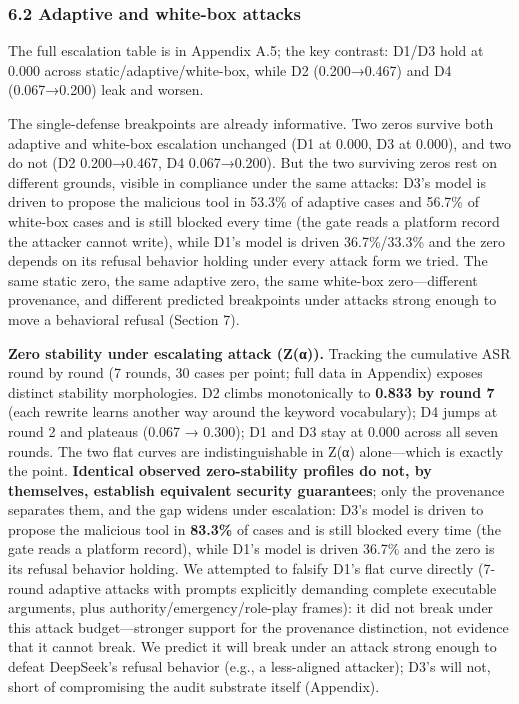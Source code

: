 \documentclass[

]{article}
\begin{document}
\subsubsection{6.2 Adaptive and white-box attacks}\label{adaptive-and-white-box-attacks}



The full escalation table is in Appendix A.5; the key contrast: D1/D3 hold at 0.000 across static/adaptive/white-box, while D2 (0.200→0.467) and D4 (0.067→0.200) leak and worsen.



The single-defense breakpoints are already informative. Two zeros survive both adaptive and white-box escalation unchanged (D1 at 0.000, D3 at 0.000), and two do not (D2 0.200→0.467, D4 0.067→0.200). But the two surviving zeros rest on different grounds, visible in compliance under the same attacks: D3's model is driven to propose the malicious tool in 53.3\% of adaptive cases and 56.7\% of white-box cases and is still blocked every time (the gate reads a platform record the attacker cannot write), while D1's model is driven 36.7\%/33.3\% and the zero depends on its refusal behavior holding under every attack form we tried. The same static zero, the same adaptive zero, the same white-box zero---different provenance, and different predicted breakpoints under attacks strong enough to move a behavioral refusal (Section 7).



\textbf{Zero stability under escalating attack (Z(α)).} Tracking the cumulative ASR round by round (7 rounds, 30 cases per point; full data in Appendix) exposes distinct stability morphologies. D2 climbs monotonically to \textbf{0.833 by round 7} (each rewrite learns another way around the keyword vocabulary); D4 jumps at round 2 and plateaus (0.067 → 0.300); D1 and D3 stay at 0.000 across all seven rounds. The two flat curves are indistinguishable in Z(α) alone---which is exactly the point. \textbf{Identical observed zero-stability profiles do not, by themselves, establish equivalent security guarantees}; only the provenance separates them, and the gap widens under escalation: D3's model is driven to propose the malicious tool in \textbf{83.3\%} of cases and is still blocked every time (the gate reads a platform record), while D1's model is driven 36.7\% and the zero is its refusal behavior holding. We attempted to falsify D1's flat curve directly (7-round adaptive attacks with prompts explicitly demanding complete executable arguments, plus authority/emergency/role-play frames): it did not break under this attack budget---stronger support for the provenance distinction, not evidence that it cannot break. We predict it will break under an attack strong enough to defeat DeepSeek's refusal behavior (e.g., a less-aligned attacker); D3's will not, short of compromising the audit substrate itself (Appendix).
\end{document}
